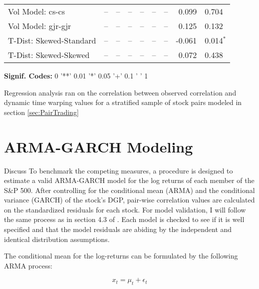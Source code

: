 \documentclass[12pt]{article}
\begin{document}
\begin{table}[!ht]
\begin{tabular}{l r l r l r l r l}
        Vol Model: cs-cs             &      -- & --           &      -- & --            &          -- & --             &   0.099 & 0.704          \\
        Vol Model: gjr-gjr           &      -- & --           &      -- & --            &          -- & --             &   0.125 & 0.132          \\
        T-Dist: Skewed-Standard      &      -- & --           &      -- & --            &          -- & --             &  -0.061 & 0.014$^{*}$    \\
        T-Dist: Skewed-Skewed        &      -- & --           &      -- & --            &          -- & --             &   0.072 & 0.438          \\
        \midrule
    \end{tabular}
    \begin{tablenotes}
        \item{\footnotesize \textbf{Signif. Codes:} 0 '**' 0.01 '*' 0.05 '+' 0.1 ' ' 1}
        \item{Regression analysis ran on the correlation between observed correlation and dynamic time warping values for a stratified sample of stock pairs modeled in section \ref{sec:PairTrading}}
    \end{tablenotes}
    \label{tbl:correlation_to_log_dtw_regression}
\end{table}

\appendix 

\section{ARMA-GARCH Modeling} \label{sec:ARMAGARCH-benchmark}

Discuss 
To benchmark the competing measures, a procedure is designed to estimate a valid ARMA-GARCH model for the log returns of each member of the S\&P 500. After controlling for the conditional mean (ARMA) and the conditional variance (GARCH) of the stock's DGP, pair-wise correlation values are calculated on the standardized residuals for each stock. For model validation, I will follow the same process as in section 4.3 of \cite{DowiakTV-COP}. Each model is checked to see if it is well specified and that the model residuals are abiding by the independent and identical distribution assumptions.

The conditional mean for the log-returns can be formulated by the following ARMA process:

\begin{equation} \label{eqn:marginalModel}
    x_{t} = \mu_{t} + \epsilon_{t}
\end{equation}
\end{document}
